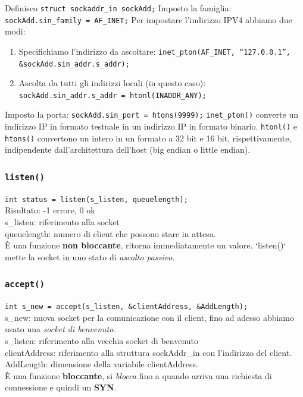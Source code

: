 Definisco \texttt{struct sockaddr\_in sockAdd;}
Imposto la famiglia: \texttt{sockAdd.sin\_family = AF\_INET;}
Per impostare l'indirizzo IPV4 abbiamo due modi:
\begin{enumerate}
  \item Specifichiamo l'indirizzo da ascoltare: \texttt{inet\_pton(AF\_INET, “127.0.0.1”, \&sockAdd.sin\_addr.s\_addr);}
  \item Ascolta da tutti gli indirizzi locali (in questo caso): \texttt{sockAdd.sin\_addr.s\_addr = htonl(INADDR\_ANY);}
\end{enumerate}
Imposto la porta: \texttt{sockAdd.sin\_port = htons(9999);}
\texttt{inet\_pton()} converte un indirizzo IP in formato testuale in un indirizzo IP in formato binario.
\texttt{htonl()} e \texttt{htons()} convertono un intero in un formato a 32 bit e 16 bit, rispettivamente, indipendente dall'architettura dell'host (big endian o little endian).

\subsubsection*{\texttt{listen()}}
\texttt{int status = listen(s\_listen, queuelength);} \\
Risultato: -1 errore, 0 ok \\
s\_listen: riferimento alla socket \\
queuelength: numero di client che possono stare in attesa. \\
È una funzione \textbf{non bloccante}, ritorna immediatamente un valore. `listen()` mette la socket in uno stato di \textit{ascolto passivo}.

\subsubsection*{\texttt{accept()}}
\texttt{int s\_new = accept(s\_listen, \&clientAddress, \&AddLength);} \\
s\_new: nuova socket per la comunicazione con il client, fino ad adesso abbiamo usato una \textit{socket di benvenuto}. \\
s\_listen: riferimento alla vecchia socket di benvenuto \\
clientAddress: riferimento alla struttura sockAddr\_in con l'indirizzo del client. \\
AddLength: dimensione della variabile clientAddress. \\
È una funzione \textbf{bloccante}, si \textit{blocca} fino a quando arriva una richiesta di connessione e quindi un \textbf{SYN}.

